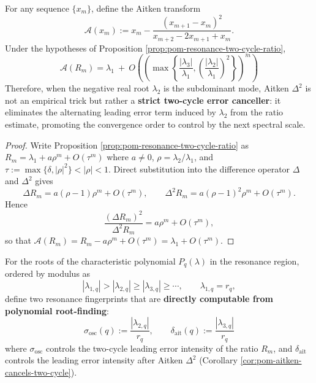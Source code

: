 \begin{corollary}\label{cor:pom-aitken-cancels-two-cycle}
For any sequence \(\{x_m\}\), define the Aitken transform
\[
\mathcal{A}(x_m):=x_m-\frac{(x_{m+1}-x_m)^2}{x_{m+2}-2x_{m+1}+x_m}.
\]
Under the hypotheses of Proposition \ref{prop:pom-resonance-two-cycle-ratio},
\[
\boxed{\;
\mathcal{A}(R_m)=\lambda_1\ +\ O\!\left(\left(\max\!\left\{\frac{|\lambda_3|}{\lambda_1},\left(\frac{|\lambda_2|}{\lambda_1}\right)^2\right\}\right)^{m}\right)\;}
\]
Therefore, when the negative real root \(\lambda_2\) is the subdominant mode, Aitken \(\Delta^2\) is not an empirical trick but rather a \textbf{strict two-cycle error canceller}: it eliminates the alternating leading error term induced by \(\lambda_2\) from the ratio estimate, promoting the convergence order to control by the next spectral scale.
\end{corollary}
\begin{proof}
Write Proposition \ref{prop:pom-resonance-two-cycle-ratio} as
\(
R_m=\lambda_1+a\rho^{m}+O(\tau^{m})
\)
where \(a\neq 0\), \(\rho=\lambda_2/\lambda_1\), and
\(
\tau:=\max\{\delta,|\rho|^2\}<|\rho|<1
\).
Direct substitution into the difference operator \(\Delta\) and \(\Delta^2\) gives
\[
\Delta R_m=a(\rho-1)\rho^{m}+O(\tau^{m}),
\qquad
\Delta^2 R_m=a(\rho-1)^2\rho^{m}+O(\tau^{m}).
\]
Hence
\[
\frac{(\Delta R_m)^2}{\Delta^2 R_m}
=a\rho^{m}+O(\tau^{m}),
\]
so that
\(
\mathcal{A}(R_m)=R_m-a\rho^{m}+O(\tau^{m})
=\lambda_1+O(\tau^{m})
\).
\end{proof}

\begin{definition}\label{def:pom-resonance-aitken-fingerprints}
For the roots of the characteristic polynomial \(P_q(\lambda)\) in the resonance region, ordered by modulus as
\[
|\lambda_{1,q}|>|\lambda_{2,q}|\ge|\lambda_{3,q}|\ge\cdots,
\qquad \lambda_{1,q}=r_q,
\]
define two resonance fingerprints that are \textbf{directly computable from polynomial root-finding}:
\[
\boxed{\;
\sigma_{\mathrm{osc}}(q):=\frac{|\lambda_{2,q}|}{r_q},
\qquad
\delta_{\mathrm{ait}}(q):=\frac{|\lambda_{3,q}|}{r_q}\;}
\]
where \(\sigma_{\mathrm{osc}}\) controls the two-cycle leading error intensity of the ratio \(R_m\), and \(\delta_{\mathrm{ait}}\) controls the leading error intensity after Aitken \(\Delta^2\) (Corollary \ref{cor:pom-aitken-cancels-two-cycle}).
\end{definition}

